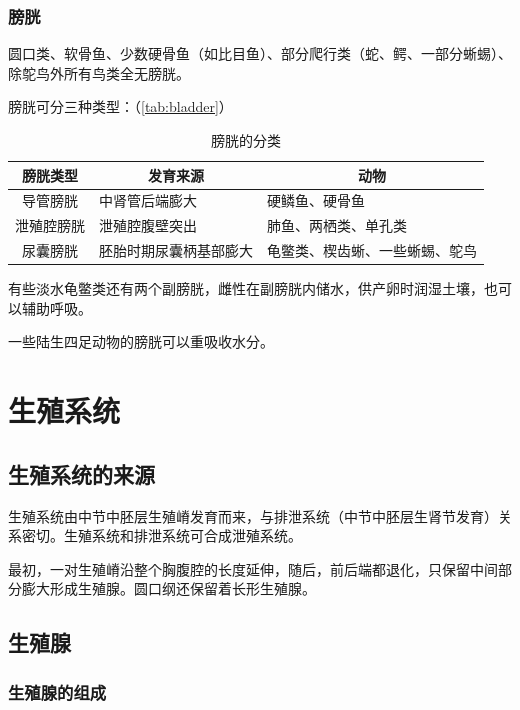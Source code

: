 \subsubsection{膀胱}

圆口类、软骨鱼、少数硬骨鱼（如比目鱼）、部分爬行类（蛇、鳄、一部分蜥蜴）、除鸵鸟外所有鸟类全无膀胱。

膀胱可分三种类型：（\autoref{tab:bladder}）

\begin{table}[htbp]
	\centering
	\begin{tabularx}{\textwidth}{|c|l|X|}
		\hline
		膀胱类型 & \multicolumn{1}{c|}{发育来源} & \multicolumn{1}{c|}{动物} \\ \hline
		导管膀胱 & 中肾管后端膨大 & 硬鳞鱼、硬骨鱼 \\ \hline
		泄殖腔膀胱 & 泄殖腔腹壁突出 & 肺鱼、两栖类、单孔类 \\ \hline
		尿囊膀胱 & 胚胎时期尿囊柄基部膨大 & 龟鳖类、楔齿蜥、一些蜥蜴、鸵鸟 \\ \hline
	\end{tabularx}
	\caption{膀胱的分类}
	\label{tab:bladder}
\end{table}

有些淡水龟鳖类还有两个副膀胱，雌性在副膀胱内储水，供产卵时润湿土壤，也可以辅助呼吸。

一些陆生四足动物的膀胱可以重吸收水分。



\section{生殖系统}

\subsection{生殖系统的来源}

生殖系统由中节中胚层生殖嵴发育而来，与排泄系统（中节中胚层生肾节发育）关系密切。生殖系统和排泄系统可合成泄殖系统。

最初，一对生殖嵴沿整个胸腹腔的长度延伸，随后，前后端都退化，只保留中间部分膨大形成生殖腺。圆口纲还保留着长形生殖腺。

\subsection{生殖腺}

\subsubsection{生殖腺的组成}

